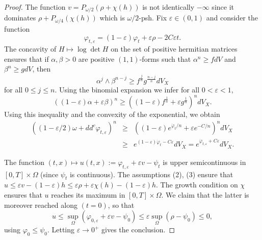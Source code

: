 \documentclass[10pt,a4paper]{amsart}
\numberwithin{equation}{section}
\newcommand{\f}{\varphi}
\newcommand \e {\varepsilon}
\begin{document}
\begin{proof}
\smallskip


The function  $v=P_{\omega/2}(\rho +\chi(h))$ is not identically $-\infty$ since it dominates 
$\rho + P_{\omega/4} (\chi(h))$ which is $\omega/2$-psh. 
Fix $\varepsilon\in (0,1)$ and consider the function 
\[
\varphi_{t,\varepsilon} =  (1-\varepsilon) \varphi_t+\varepsilon \rho-2C\varepsilon t. 
\]
The concavity of $H \mapsto \log \det H$ on the set of positive hermitian matrices 
ensures that if $\alpha,\beta >0$ are positive $(1,1)$-forms such that
$\alpha^n \geq f dV$ and $\beta^n \geq g dV$, then 
$$
\alpha^j \wedge \beta^{n-j} \geq f^{\frac{j}{n}} g^{\frac{n-j}{n}} dV_X
$$
for all $0 \leq j \leq n$. Using the binomial expansion we infer for all $0<\e<1$,
$$
((1-\e) \alpha+\e \beta)^n \geq \left( (1-\e) f^{\frac{1}{n}} +\e g^{\frac{1}{n}} \right)^n dV_X.
$$
Using this inequality and the convexity of  the exponential, we obtain
\begin{eqnarray*}
((1-\varepsilon/2)\omega + dd^c \varphi_{t,\varepsilon})^n  
&\geq & \left((1-\varepsilon) e^{\dot \varphi_t/n} + \varepsilon  e^{-C/n}\right)^ndV_X\\
&\geq &  e^{(1-\varepsilon) \dot \varphi_t -C\varepsilon }dV_X= e^{\dot{\varphi}_{t,\varepsilon}+C\varepsilon}dV_X.
\end{eqnarray*}
 

The function $(t,x) \mapsto u(t,x):= \varphi_{t,\varepsilon}+ \varepsilon v -\psi_{t}$
 is upper semicontinuous in $[0,T]\times \Omega$ (since $\psi_t$ is continuous).
 The assumptions (2), (3) ensure that $u\leq \varepsilon v-(1-\varepsilon)h \leq \varepsilon \rho + \varepsilon \chi(h)-(1-\varepsilon)h $. The growth condition on $\chi$ ensures that $u$ reaches its maximum in $[0,T]\times \Omega$.
  We claim that the latter is moreover reached
 along $(t=0)$, so that 
 $$
 u \leq \sup_{\Omega} (\f_{0,\e}+\varepsilon v -\psi_0) \leq \varepsilon \sup_{\Omega} (\rho-\psi_0) \leq 0,
 $$
using $\varphi_0\leq \psi_0$.
 Letting $\varepsilon \to 0^+$ gives the conclusion. 
 
 \smallskip
 

\end{proof}
\end{document}
